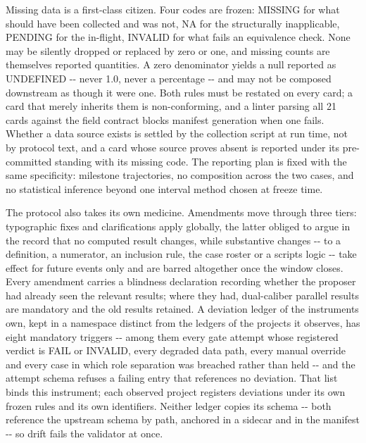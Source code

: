 \documentclass[
  english,
]{article}
\begin{document}
Missing data is a first-class citizen. Four codes are frozen: MISSING for what should have been collected and was not, NA for the structurally inapplicable, PENDING for the in-flight, INVALID for what fails an equivalence check. None may be silently dropped or replaced by zero or one, and missing counts are themselves reported quantities. A zero denominator yields a null reported as UNDEFINED -\/- never 1.0, never a percentage -\/- and may not be composed downstream as though it were one. Both rules must be restated on every card; a card that merely inherits them is non-conforming, and a linter parsing all 21 cards against the field contract blocks manifest generation when one fails. Whether a data source exists is settled by the collection script at run time, not by protocol text, and a card whose source proves absent is reported under its pre-committed standing with its missing code. The reporting plan is fixed with the same specificity: milestone trajectories, no composition across the two cases, and no statistical inference beyond one interval method chosen at freeze time.

The protocol also takes its own medicine. Amendments move through three tiers: typographic fixes and clarifications apply globally, the latter obliged to argue in the record that no computed result changes, while substantive changes -\/- to a definition, a numerator, an inclusion rule, the case roster or a script\textquotesingle s logic -\/- take effect for future events only and are barred altogether once the window closes. Every amendment carries a blindness declaration recording whether the proposer had already seen the relevant results; where they had, dual-caliber parallel results are mandatory and the old results retained. A deviation ledger of the instrument\textquotesingle s own, kept in a namespace distinct from the ledgers of the projects it observes, has eight mandatory triggers -\/- among them every gate attempt whose registered verdict is FAIL or INVALID, every degraded data path, every manual override and every case in which role separation was breached rather than held -\/- and the attempt schema refuses a failing entry that references no deviation. That list binds this instrument; each observed project registers deviations under its own frozen rules and its own identifiers. Neither ledger copies its schema -\/- both reference the upstream schema by path, anchored in a sidecar and in the manifest -\/- so drift fails the validator at once.
\end{document}
